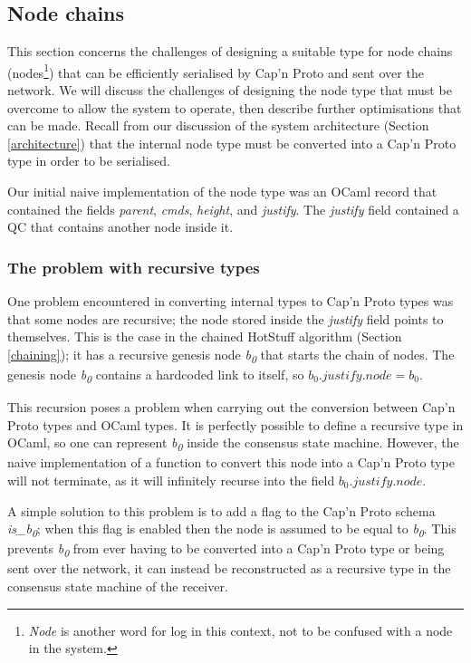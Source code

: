 \subsection{Node chains}
This section concerns the challenges of designing a suitable type for node chains (nodes\footnote{\textit{Node} is another word for log in this context, not to be confused with a node in the system.}) that can be efficiently serialised by Cap'n Proto and sent over the network. We will discuss the challenges of designing the node type that must be overcome to allow the system to operate, then describe further optimisations that can be made. Recall from our discussion of the system architecture (Section \ref{architecture}) that the internal node type must be converted into a Cap'n Proto type in order to be serialised.

Our initial naive implementation of the node type was an OCaml record that contained the fields \textit{parent}, \textit{cmds}, \textit{height}, and \textit{justify}. The \textit{justify} field contained a QC that contains another node inside it.

\subsubsection{The problem with recursive types}
One problem encountered in converting internal types to Cap'n Proto types was that some nodes are recursive; the node stored inside the \textit{justify} field points to themselves. This is the case in the chained HotStuff algorithm (Section \ref{chaining}); it has a recursive genesis node \textit{b\textsubscript{0}} that starts the chain of nodes. The genesis node \textit{b\textsubscript{0}} contains a hardcoded link to itself, so $ b_0.\textit{justify}.\textit{node} = b_0$.

This recursion poses a problem when carrying out the conversion between Cap'n Proto types and OCaml types. It is perfectly possible to define a recursive type in OCaml, so one can represent \textit{b\textsubscript{0}} inside the consensus state machine. However, the naive implementation of a function to convert this node into a Cap'n Proto type will not terminate, as it will infinitely recurse into the field $ b_0.\textit{justify}.\textit{node} $.

A simple solution to this problem is to add a flag to the Cap'n Proto schema \textit{is\_b\textsubscript{0}}; when this flag is enabled then the node is assumed to be equal to \textit{b\textsubscript{0}}. This prevents \textit{b\textsubscript{0}} from ever having to be converted into a Cap'n Proto type or being sent over the network, it can instead be reconstructed as a recursive type in the consensus state machine of the receiver.

